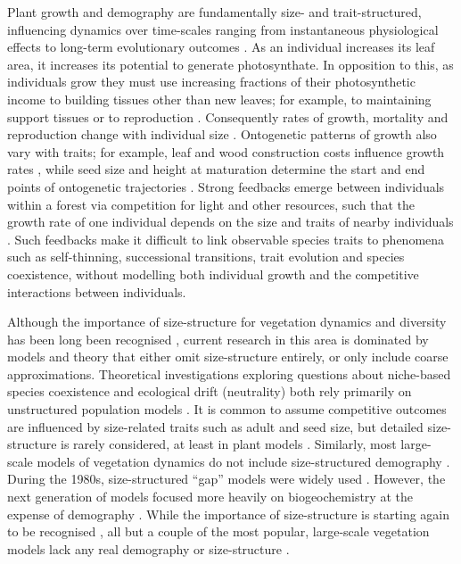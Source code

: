 \documentclass[a4paper,11pt]{article}
\begin{document}
Plant growth and demography are fundamentally size- and 
trait-structured, influencing dynamics over time-scales ranging from
instantaneous physiological effects to long-term evolutionary outcomes
\citep{Harper-1977, Westoby-2002}. 
%
As an individual increases its leaf area, it increases its potential
to generate photosynthate.
%
In opposition to this, as individuals grow they must use increasing
fractions of their photosynthetic income to building tissues other
than new leaves; for example, to maintaining support tissues
\citep{Givnish-1988, Enquist-2007} or to reproduction
\citep{Thomas-2011}.
%
Consequently rates of growth, mortality and reproduction change with
individual size \citep{Muller-2006, Ruger-2011, Thomas-2011}.  
Ontogenetic 
patterns of growth also vary with traits; for example,
leaf and wood construction costs influence growth rates 
\citep{Wright-2010}, while seed size and height
at maturation determine the start and end points of ontogenetic
trajectories \citep{Westoby-2002}.
%
Strong feedbacks emerge between individuals within a forest via
competition for light and other resources, such that the growth rate
of one individual depends on the size and traits of nearby
individuals \citep{Pacala-1996}.
%
Such feedbacks make it difficult to link observable species traits to
phenomena such as self-thinning, successional transitions, trait
evolution and species coexistence, without
modelling both individual growth and the competitive interactions between
individuals.

Although the importance of size-structure for vegetation dynamics and
diversity has been long been recognised \citep[e.g.,][]{Harper-1977,
  Shugart-1980, Huston-1987}, current research in this area is
dominated by models and theory that either omit size-structure
entirely, or only include coarse approximations. 
%
Theoretical investigations exploring questions about niche-based
species coexistence and ecological drift (neutrality) both rely
primarily on unstructured population models \citep[e.g.][]{MacArthur-1967,
  Tilman-1985, Geritz-1995, Hubbell-2001, Calcagno-2006}.
%
It is common to assume competitive outcomes are influenced by
size-related traits such as adult and seed size, but detailed
size-structure is rarely considered, at least in plant models
\cite[for animal examples, see][]{Deroos-1988, Deroos-1992}.
Similarly, most large-scale models of vegetation dynamics do not
include size-structured demography \citep{Cramer-2001, Sitch-2003,
  Purves-2008,Dekauwe-2014}.  During the 1980s, size-structured
``gap'' models were widely used
\citep[e.g.][]{Shugart-1980,Huston-1987}. However, the next generation
of models focused more heavily on biogeochemistry at the expense of
demography \citep[e.g.][]{Woodward-1995,Haxeltine-1996,Cramer-2001, 
Sitch-2003}. While the
importance of size-structure is starting again to be recognised
\citep{Moorcroft-2001, Purves-2008, Falster-2011, Dekauwe-2014}, all but a couple
of the most popular,
large-scale vegetation models lack any real demography or
size-structure \citep[see][]{Moorcroft-2001, Smith-2014}.
\end{document}

